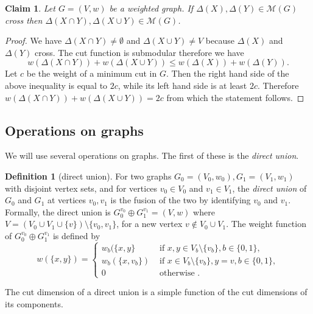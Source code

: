 \documentclass[10pt,a4paper]{article}
\newcommand{\M}{\mathcal{M}}
\newcommand{\1}{\mathbf{1}}
\newtheorem{claim}[theorem]{Claim}
\theoremstyle{definition}
\newtheorem{definition}[theorem]{Definition}
\begin{document}
\begin{claim}
\label{claim:mincuts}
Let $G=(V,w)$ be a weighted graph.
If $\Delta(X), \Delta(Y) \in \M(G)$ cross then
$\Delta(X \cap Y), \Delta(X \cup Y)  \in \M(G)$.
\end{claim}

\begin{proof}
We have $\Delta(X \cap Y) \neq \emptyset $ and $ \Delta(X \cup Y) \neq V$ because $\Delta(X)$ and $\Delta(Y)$ cross. The cut function is submodular therefore we have
\begin{equation*}
\label{eq:mincuts}
w(\Delta(X \cap Y) ) + w(\Delta(X \cup Y) ) \leq w(\Delta(X)) + w(\Delta(Y)).
\end{equation*}
Let $c$ be the weight of a minimum cut in $G$. Then the right hand side of the above inequality
is equal to $2c$, while its left hand side is at least $2c$. Therefore
$w(\Delta(X \cap Y) ) + w(\Delta(X \cup Y) ) = 2c$ from which the statement follows.
\end{proof}

\subsection{Operations on graphs}
We will use several operations on graphs.  The first of these is the \emph{direct union}.
\begin{definition}[direct union]
\label{def:du}
For two graphs $G_0= (V_0, w_0), G_1 = (V_1,w_1)$
with disjoint vertex sets,
and for vertices $v_0 \in V_0$ and $v_1 \in V_1$, the {\em direct union} of $G_0$ and $G_1$ at vertices
$v_0,v_1$ is the fusion of the two by identifying $v_0$ and $v_1$. Formally, the direct union is
$G_0^{v_0} \oplus   G_1^{v_1} = (V,w)$
where $V = ( V_0 \cup V_1 \cup \{v\} ) \setminus \{v_0,v_1\}$, for a new vertex
$v \not\in V_0 \cup V_1 $. The weight function  of $G_0^{v_0} \oplus   G_1^{v_1}$
is defined by
\begin{equation*}
w (\{x,y\}) =
\begin{cases}
w_b (\{x,y\}  & \text{ if } x,y \in V_b \setminus \{v_b\}, b\in \{0,1\}, \\
w_b(\{x,v_b\}) & \text{ if } x\in V_b \setminus \{v_b\}, y=v, b\in \{0,1\}, \\
0 &  \text{ otherwise }.
\end{cases}
\end{equation*}
\end{definition}
The cut dimension of a direct union is a simple function of the cut dimensions of its components.
\end{document}

